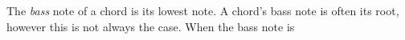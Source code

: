 The \textit{bass} note of a chord is its lowest note. A chord's bass note is often its root, however this is not always the case. When the bass note is 